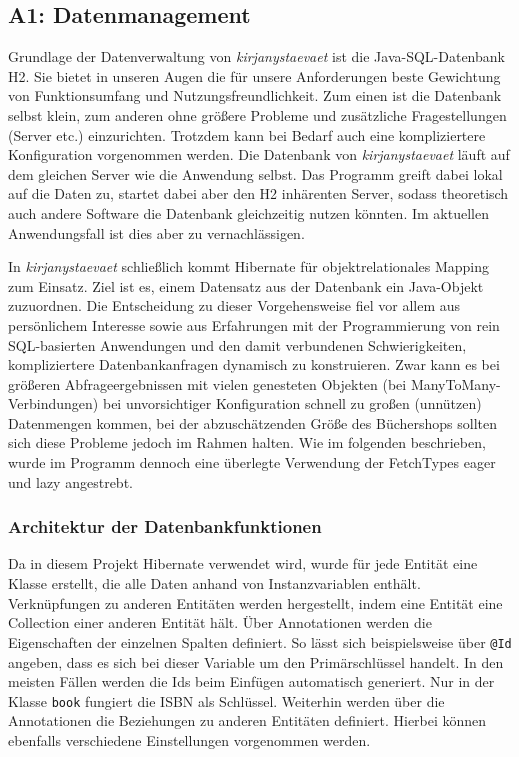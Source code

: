	
	\subsection{A1: Datenmanagement}\label{sec:umsetzung:DB:DM}
	Grundlage der Datenverwaltung von \textit{kirjanystaevaet} ist die Java-SQL-Datenbank H2. Sie bietet in unseren Augen die für unsere Anforderungen beste Gewichtung von Funktionsumfang und Nutzungsfreundlichkeit. Zum einen ist die Datenbank selbst klein, zum anderen ohne größere Probleme und zusätzliche Fragestellungen (Server etc.) einzurichten. Trotzdem kann bei Bedarf auch eine kompliziertere Konfiguration vorgenommen werden. Die Datenbank von \textit{kirjanystaevaet} läuft auf dem gleichen Server wie die Anwendung selbst. Das Programm greift dabei lokal auf die Daten zu, startet dabei aber den H2 inhärenten Server, sodass theoretisch auch andere Software die Datenbank gleichzeitig nutzen könnten. Im aktuellen Anwendungsfall ist dies aber zu vernachlässigen.
	
	In \textit{kirjanystaevaet} schließlich kommt Hibernate für objektrelationales Mapping zum Einsatz. Ziel ist es, einem Datensatz aus der Datenbank ein Java-Objekt zuzuordnen. Die Entscheidung zu dieser Vorgehensweise fiel vor allem aus persönlichem Interesse sowie aus Erfahrungen mit der Programmierung von rein SQL-basierten Anwendungen und den damit verbundenen Schwierigkeiten, kompliziertere Datenbankanfragen dynamisch zu konstruieren. Zwar kann es bei größeren Abfrageergebnissen mit vielen genesteten Objekten (bei ManyToMany-Verbindungen) bei unvorsichtiger Konfiguration schnell zu großen (unnützen) Datenmengen kommen, bei der abzuschätzenden Größe des Büchershops sollten sich diese Probleme jedoch im Rahmen halten. Wie im folgenden beschrieben, wurde im Programm dennoch eine überlegte Verwendung der FetchTypes eager und lazy angestrebt.
		
		\subsubsection{Architektur der Datenbankfunktionen}\label{sec:umsetzung:DB:Funktionen}
		Da in diesem Projekt Hibernate verwendet wird, wurde für jede Entität eine Klasse erstellt, die alle Daten anhand von Instanzvariablen enthält. Verknüpfungen zu anderen Entitäten werden hergestellt, indem eine Entität eine Collection einer anderen Entität hält. Über Annotationen werden die Eigenschaften der einzelnen Spalten definiert. So lässt sich beispielsweise über \texttt{@Id} angeben, dass es sich bei dieser Variable um den Primärschlüssel handelt. In den meisten Fällen werden die Ids beim Einfügen automatisch generiert. Nur in der Klasse \texttt{book} fungiert die ISBN als Schlüssel. Weiterhin werden über die Annotationen die Beziehungen zu anderen Entitäten definiert. Hierbei können ebenfalls verschiedene Einstellungen vorgenommen werden.
		
